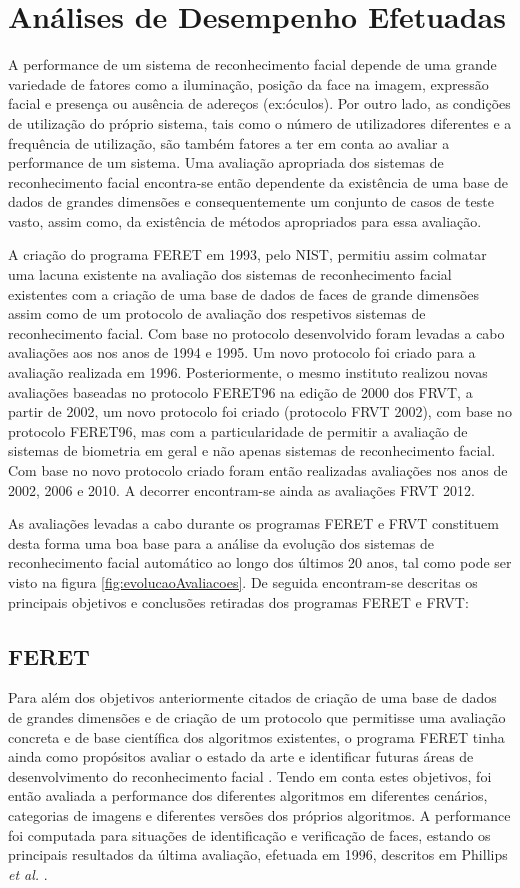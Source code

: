 \section{Análises de Desempenho Efetuadas}\label{sec:performance}
A performance de um sistema de reconhecimento facial depende de uma grande variedade de fatores como a iluminação, posição da face na imagem, expressão facial e presença ou ausência de adereços (ex:óculos). Por outro lado, as condições de utilização do próprio sistema, tais como o número de utilizadores diferentes e a frequência de utilização, são também fatores a ter em conta ao avaliar a performance de um sistema. Uma avaliação apropriada dos sistemas de reconhecimento facial encontra-se então dependente da existência de uma base de dados de grandes dimensões e consequentemente um conjunto de casos de teste vasto, assim como, da existência de métodos apropriados para essa avaliação.

A criação do programa FERET em 1993, pelo NIST, permitiu assim colmatar uma lacuna existente na avaliação dos sistemas de reconhecimento facial existentes com a criação de uma base de dados de faces de grande dimensões assim como de um protocolo de avaliação dos respetivos sistemas de reconhecimento facial. Com base no protocolo desenvolvido foram levadas a cabo avaliações aos nos anos de 1994 e 1995. Um novo protocolo foi criado para a avaliação realizada em 1996. Posteriormente, o mesmo instituto realizou novas avaliações baseadas no protocolo FERET96 na edição de 2000 dos FRVT, a partir de 2002, um novo protocolo foi criado (protocolo FRVT 2002), com base no protocolo FERET96, mas com a particularidade de permitir a avaliação de sistemas de biometria em geral e não apenas sistemas de reconhecimento facial. Com base no novo protocolo criado foram então realizadas avaliações nos anos de 2002, 2006 e 2010. A decorrer encontram-se ainda as avaliações FRVT 2012. 

As avaliações levadas a cabo durante os programas FERET e FRVT constituem desta forma uma boa base para a análise da evolução dos sistemas de reconhecimento facial automático ao longo dos últimos 20 anos, tal como pode ser visto na figura \ref{fig:evolucaoAvaliacoes}. De seguida encontram-se descritas os principais objetivos e conclusões retiradas dos programas FERET e FRVT:

\subsection{FERET}
Para além dos objetivos anteriormente citados de criação de uma base de dados de grandes dimensões e de criação de um protocolo que permitisse uma avaliação concreta e de base científica dos algoritmos existentes, o programa FERET tinha ainda como propósitos avaliar o estado da arte e identificar futuras áreas de desenvolvimento do reconhecimento facial \cite{Phillips2000}. Tendo em conta estes objetivos, foi então avaliada a performance dos diferentes algoritmos em diferentes cenários, categorias de imagens e diferentes versões dos próprios algoritmos. A performance foi computada para situações de identificação e verificação de faces, estando os principais resultados da última avaliação, efetuada em 1996, descritos em Phillips \textit{et al.} \cite{Phillips2000}.

